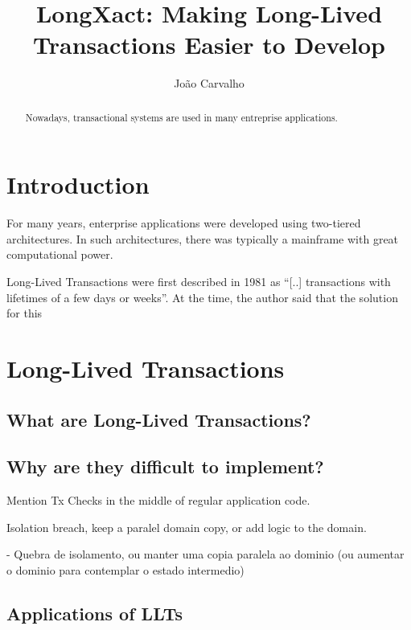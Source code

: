 \documentclass{llncs}
\begin{document}
\title{LongXact: Making Long-Lived Transactions Easier to Develop}

\author{João Carvalho}
\maketitle


\begin{abstract}
Nowadays, transactional systems are used in many entreprise
applications.
\end{abstract}


\section{Introduction}

For many years, enterprise applications were developed using
two-tiered architectures. In such architectures, there was typically a
mainframe with great computational power.

Long-Lived Transactions were first described in
1981 as ``[..] transactions with lifetimes of a few days or
weeks''\cite{gray1981transaction}. At the time, the author said that the
solution for this 

\section{Long-Lived Transactions}

\subsection{What are Long-Lived Transactions?}

\subsection{Why are they difficult to implement?}

Mention Tx Checks in the middle of regular application code.

Isolation breach, keep a paralel domain copy, or add logic to the
domain.

     - Quebra de isolamento, ou manter uma copia paralela ao dominio
     (ou aumentar o dominio para contemplar o estado intermedio)

\subsection{Applications of LLTs}
\end{document}
